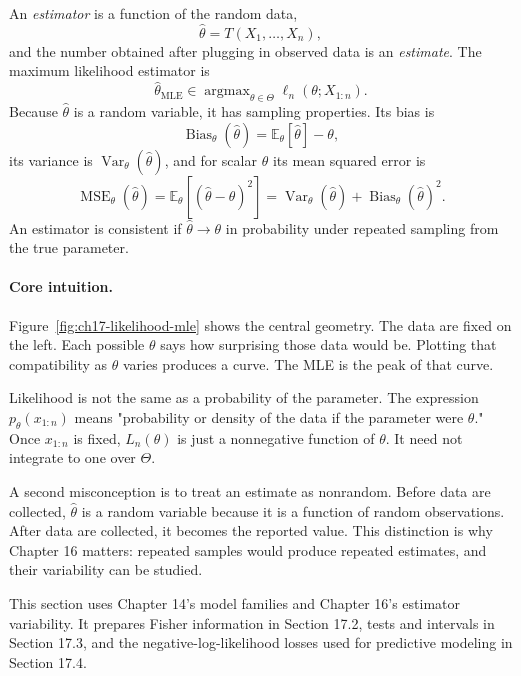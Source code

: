 An \emph{estimator} is a function of the random data,
\[
\hat\theta=T(X_1,\ldots,X_n),
\]
and the number obtained after plugging in observed data is an \emph{estimate}. The maximum likelihood estimator is
\[
\boxed{
\hat\theta_{\mathrm{MLE}}
\in
\operatorname{argmax}_{\theta\in\Theta}\ell_n(\theta;X_{1:n}).
}
\]
Because \(\hat\theta\) is a random variable, it has sampling properties. Its bias is
\[
\operatorname{Bias}_\theta(\hat\theta)
=\mathbb E_\theta[\hat\theta]-\theta,
\]
its variance is \(\operatorname{Var}_\theta(\hat\theta)\), and for scalar \(\theta\) its mean squared error is
\[
\operatorname{MSE}_\theta(\hat\theta)
=\mathbb E_\theta[(\hat\theta-\theta)^2]
=\operatorname{Var}_\theta(\hat\theta)+\operatorname{Bias}_\theta(\hat\theta)^2.
\]
An estimator is consistent if \(\hat\theta\to\theta\) in probability under repeated sampling from the true parameter.

\paragraph{Core intuition.}
Figure~\ref{fig:ch17-likelihood-mle} shows the central geometry. The data are fixed on the left. Each possible \(\theta\) says how surprising those data would be. Plotting that compatibility as \(\theta\) varies produces a curve. The MLE is the peak of that curve.

Likelihood is not the same as a probability of the parameter. The expression \(p_\theta(x_{1:n})\) means "probability or density of the data if the parameter were \(\theta\)." Once \(x_{1:n}\) is fixed, \(L_n(\theta)\) is just a nonnegative function of \(\theta\). It need not integrate to one over \(\Theta\).

A second misconception is to treat an estimate as nonrandom. Before data are collected, \(\hat\theta\) is a random variable because it is a function of random observations. After data are collected, it becomes the reported value. This distinction is why Chapter 16 matters: repeated samples would produce repeated estimates, and their variability can be studied.

This section uses Chapter 14's model families and Chapter 16's estimator variability. It prepares Fisher information in Section 17.2, tests and intervals in Section 17.3, and the negative-log-likelihood losses used for predictive modeling in Section 17.4.

